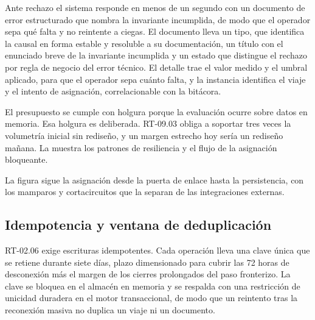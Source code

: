 Ante rechazo el sistema responde en menos de un segundo con un documento de error estructurado que
nombra la invariante incumplida, de modo que el operador sepa qué falta y no reintente a ciegas. El
documento lleva un tipo, que identifica la causal en forma estable y resoluble a su documentación, un
título con el enunciado breve de la invariante incumplida y un estado que distingue el rechazo por regla
de negocio del error técnico. El detalle trae el valor medido y el umbral aplicado, para que el operador
sepa cuánto falta, y la instancia identifica el viaje y el intento de asignación, correlacionable con la
bitácora.

El presupuesto se cumple con holgura porque la evaluación ocurre sobre datos en memoria. Esa holgura es
deliberada. RT-09.03 obliga a soportar tres veces la volumetría inicial sin rediseño, y un margen
estrecho hoy sería un rediseño mañana. La  muestra los patrones de resiliencia
y el flujo de la asignación bloqueante.


La figura sigue la asignación desde la puerta de enlace hasta la persistencia, con los mamparos y
cortacircuitos que la separan de las integraciones externas.


\subsection{Idempotencia y ventana de deduplicación}\label{sec:4-idempotencia}

RT-02.06 exige escrituras idempotentes. Cada operación lleva una clave única que se retiene durante
siete días, plazo dimensionado para cubrir las 72 horas de desconexión más el margen de los cierres
prolongados del paso fronterizo. La clave se bloquea en el almacén en memoria y se respalda con una
restricción de unicidad duradera en el motor transaccional, de modo que un reintento tras la
reconexión masiva no duplica un viaje ni un documento.

